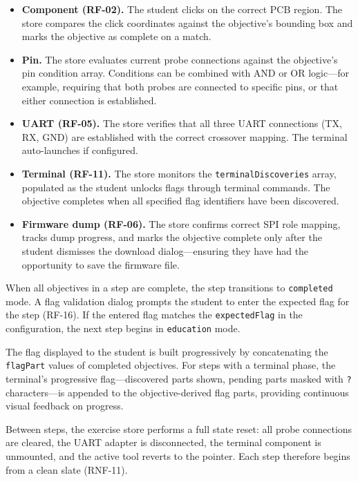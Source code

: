 \begin{itemize}
    \item \textbf{Component (RF-02).} The student clicks on the correct PCB region. The store compares the click coordinates against the objective's bounding box and marks the objective as complete on a match.
    \item \textbf{Pin.} The store evaluates current probe connections against the objective's pin condition array. Conditions can be combined with AND or OR logic---for example, requiring that both probes are connected to specific pins, or that either connection is established.
    \item \textbf{UART (RF-05).} The store verifies that all three UART connections (TX, RX, GND) are established with the correct crossover mapping. The terminal auto-launches if configured.
    \item \textbf{Terminal (RF-11).} The store monitors the \texttt{terminalDiscoveries} array, populated as the student unlocks flags through terminal commands. The objective completes when all specified flag identifiers have been discovered.
    \item \textbf{Firmware dump (RF-06).} The store confirms correct SPI role mapping, tracks dump progress, and marks the objective complete only after the student dismisses the download dialog---ensuring they have had the opportunity to save the firmware file.
\end{itemize}

When all objectives in a step are complete, the step transitions to \texttt{completed} mode. A flag validation dialog prompts the student to enter the expected flag for the step (RF-16). If the entered flag matches the \texttt{expectedFlag} in the configuration, the next step begins in \texttt{education} mode.

The flag displayed to the student is built progressively by concatenating the \texttt{flagPart} values of completed objectives. For steps with a terminal phase, the terminal's progressive flag---discovered parts shown, pending parts masked with \texttt{?} characters---is appended to the objective-derived flag parts, providing continuous visual feedback on progress.

Between steps, the exercise store performs a full state reset: all probe connections are cleared, the UART adapter is disconnected, the terminal component is unmounted, and the active tool reverts to the pointer. Each step therefore begins from a clean slate (RNF-11).

